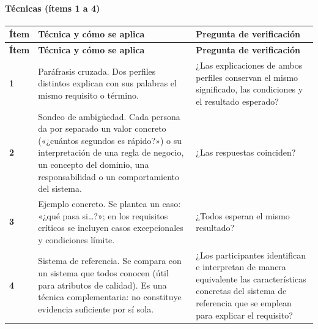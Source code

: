 \documentclass[12pt,letterpaper,oneside]{report}
\begin{document}
\paragraph{Técnicas (ítems 1 a 4)}
{\scriptsize\renewcommand{\arraystretch}{1.25}\setlength{\tabcolsep}{3pt}
\begin{xltabular}{\textwidth}{@{}>{\raggedright\arraybackslash}p{0.05\textwidth}>{\raggedright\arraybackslash}X>{\raggedright\arraybackslash}p{0.35\textwidth}@{}}
\toprule
\textbf{Ítem} & \textbf{Técnica y cómo se aplica} & \textbf{Pregunta de verificación} \\
\midrule
\endfirsthead
\toprule
\textbf{Ítem} & \textbf{Técnica y cómo se aplica} & \textbf{Pregunta de verificación} \\
\midrule
\endhead
\bottomrule
\endlastfoot
\textbf{1} & Paráfrasis cruzada. Dos perfiles distintos explican con sus palabras el mismo requisito o término. & ¿Las explicaciones de ambos perfiles conservan el mismo significado, las condiciones y el resultado esperado? \\
\textbf{2} & Sondeo de ambigüedad. Cada persona da por separado un valor concreto («¿cuántos segundos es rápido?») o su interpretación de una regla de negocio, un concepto del dominio, una responsabilidad o un comportamiento del sistema. & ¿Las respuestas coinciden? \\
\textbf{3} & Ejemplo concreto. Se plantea un caso: «¿qué pasa si\ldots{}?»; en los requisitos críticos se incluyen casos excepcionales y condiciones límite. & ¿Todos esperan el mismo resultado? \\
\textbf{4} & Sistema de referencia. Se compara con un sistema que todos conocen (útil para atributos de calidad). Es una técnica complementaria: no constituye evidencia suficiente por sí sola. & ¿Los participantes identifican e interpretan de manera equivalente las características concretas del sistema de referencia que se emplean para explicar el requisito? \\
\end{xltabular}}
\end{document}

